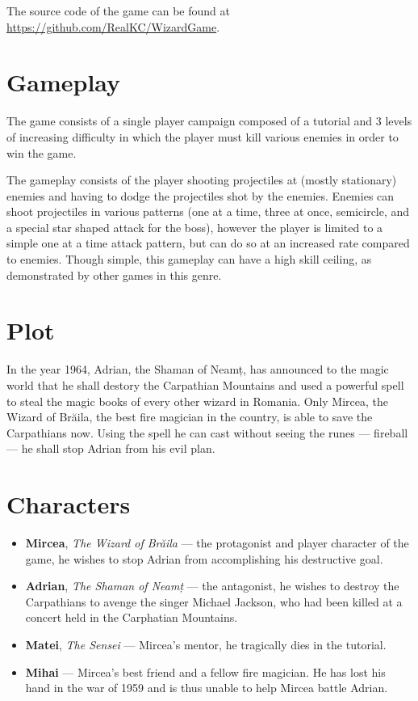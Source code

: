 \documentclass{article}
\begin{document}
    The source code of the game can be found at \url{https://github.com/RealKC/WizardGame}.

    \section{Gameplay}

    The game consists of a single player campaign composed of a tutorial and 3 levels of increasing
    difficulty in which the player must kill various enemies in order to win the game.

    The gameplay consists of the player shooting projectiles at (mostly stationary) enemies and having
    to dodge the projectiles shot by the enemies. Enemies can shoot projectiles in various patterns
    (one at a time, three at once, semicircle, and a special star shaped attack for the boss), however
    the player is limited to a simple one at a time attack pattern, but can do so at an increased rate
    compared to enemies. Though simple, this gameplay can have a high skill ceiling, as demonstrated
    by other games in this genre.

    \section{Plot}

    In the year 1964, Adrian, the Shaman of Neamț, has announced to the magic world that he
    shall destory the Carpathian Mountains and used a powerful spell to steal the magic books of
    every other wizard in Romania. Only Mircea, the Wizard of Brăila, the best fire magician in the
    country, is able to save the Carpathians now. Using the spell he can cast without seeing the
    runes --- fireball --- he shall stop Adrian from his evil plan.

    \section{Characters}
    \begin{itemize}
        \item \textbf{Mircea}, \emph{The Wizard of Brăila} --- the protagonist and player character
        of the game, he wishes to stop Adrian from accomplishing his destructive goal.
        \item \textbf{Adrian}, \emph{The Shaman of Neamț} --- the antagonist, he wishes to
        destroy the Carpathians to avenge the singer Michael Jackson, who had been killed at a concert
        held in the Carphatian Mountains.
        \item \textbf{Matei}, \emph{The Sensei} --- Mircea's mentor, he tragically dies in the tutorial.
        \item \textbf{Mihai} --- Mircea's best friend and a fellow fire magician. He has lost his hand
        in the war of 1959 and is thus unable to help Mircea battle Adrian.
    \end{itemize}
\end{document}
